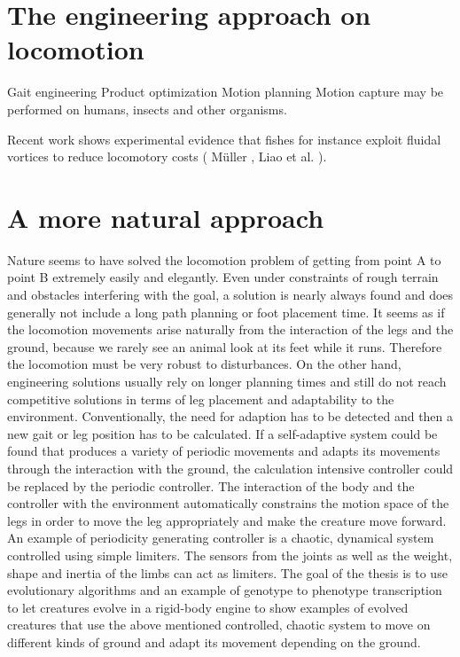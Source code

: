 \documentclass[main]{subfiles}
\begin{document}
\section{The engineering approach on locomotion}


Gait engineering
Product optimization
Motion planning
Motion capture may be performed on humans, insects and other organisms.

Recent work shows experimental evidence that fishes for instance exploit fluidal vortices to reduce locomotory costs ( Müller \cite{bib:Muller2003}, Liao et al. \cite{bib:Liao2003a,bib:Liao2003b}).

\section{A more natural approach}

Nature seems to have solved the locomotion problem of getting from point A to point B extremely easily and elegantly. %
%
Even under constraints of rough terrain and obstacles interfering with the goal, a solution is nearly always found and does generally not include a long path planning or foot placement time. %
%
It seems as if the locomotion movements arise naturally from the interaction of the legs and the ground, because we rarely see an animal look at its feet while it runs. %
%
Therefore the locomotion must be very robust to disturbances. %
%
On the other hand, engineering solutions usually rely on longer planning times and still do not reach competitive solutions in terms of leg placement and adaptability to the environment. %
%
Conventionally, the need for adaption has to be detected and then a new gait or leg position has to be calculated. %
%
If a self-adaptive system could be found that produces a variety of periodic movements and adapts its movements through the interaction with the ground, the calculation intensive controller could be replaced by the periodic controller. %
%
The interaction of the body and the controller with the environment automatically constrains the motion space of the legs in order to move the leg appropriately and make the creature move forward. %
%
An example of periodicity generating controller is a chaotic, dynamical system controlled using simple limiters. %
%
The sensors from the joints as well as the weight, shape and inertia of the limbs can act as limiters. %
%
The goal of the thesis is to use evolutionary algorithms and an example of genotype to phenotype transcription to let creatures evolve in a rigid-body engine to show examples of evolved creatures that use the above mentioned controlled, chaotic system to move on different kinds of ground and adapt its movement depending on the ground.
\end{document}
